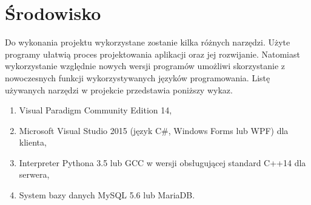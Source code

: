 \section {Środowisko}
Do wykonania projektu wykorzystane zostanie kilka różnych narzędzi. Użyte programy ułatwią proces projektowania aplikacji oraz jej rozwijanie. Natomiast wykorzystanie względnie nowych wersji programów umożliwi skorzystanie z nowoczesnych funkcji wykorzystywanych języków programowania. Listę używanych narzędzi w projekcie przedstawia poniższy wykaz.

\begin{enumerate}
	\item Visual Paradigm Community Edition 14,
	\item Microsoft Visual Studio 2015 (język C\#, Windows Forms lub WPF) dla klienta,
	\item Interpreter Pythona 3.5 lub GCC w wersji obsługującej standard C++14 dla serwera,
	\item System bazy danych MySQL 5.6 lub MariaDB.
\end{enumerate}